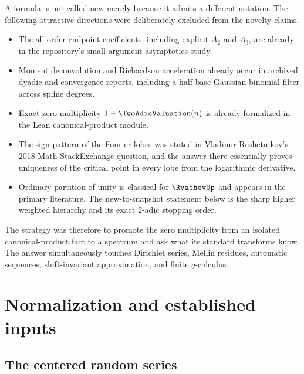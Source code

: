 \documentclass[11pt]{article}
\numberwithin{equation}{section}
\theoremstyle{definition}
\theoremstyle{remark}
\begin{document}
A formula is not called new merely because it admits a different notation.  The
following attractive directions were deliberately excluded from the novelty
claims.
\begin{itemize}
\item The all-order endpoint coefficients, including explicit $A_2$ and $A_3$,
      are already in the repository's small-argument asymptotics study.
\item Moment deconvolution and Richardson acceleration already occur in archived
      dyadic and convergence reports, including a half-base Gaussian-binomial
      filter across spline degrees.
\item Exact zero multiplicity $1+\TwoAdicValuation(n)$ is already formalized in the Lean
      canonical-product module.
\item The sign pattern of the Fourier lobes was stated in Vladimir Reshetnikov's
      2018 Math StackExchange question, and the answer there essentially proves
      uniqueness of the critical point in every lobe from the logarithmic
      derivative.
\item Ordinary partition of unity is classical for $\RvachevUp$ and appears in the
      primary literature.  The new-to-snapshot statement below is the sharp
      higher weighted hierarchy and its exact $2$-adic stopping order.
\end{itemize}

The strategy was therefore to promote the zero multiplicity from an isolated
canonical-product fact to a spectrum and ask what its standard transforms know.
The answer simultaneously touches Dirichlet series, Mellin residues, automatic
sequences, shift-invariant approximation, and finite $q$-calculus.

\section{Normalization and established inputs}
\label{p2:sec:normalization}

\subsection{The centered random series}
\end{document}

